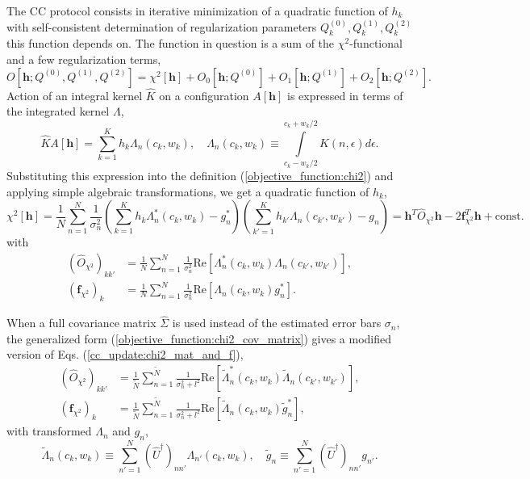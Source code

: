 \documentclass[]{article}
\begin{document}
The CC protocol consists in iterative minimization of a quadratic function of $h_k$ with self-consistent determination of regularization parameters $Q^{(0)}_k, Q^{(1)}_k, Q^{(2)}_k$ this function depends on. The function in question is a sum of the $\chi^2$-functional and a few regularization terms,
\begin{equation}
    O[\mathbf{h}; Q^{(0)},Q^{(1)},Q^{(2)}] = \chi^2[\mathbf{h}]
     + O_0[\mathbf{h};Q^{(0)}]
     + O_1[\mathbf{h};Q^{(1)}]
     + O_2[\mathbf{h};Q^{(2)}].
\end{equation}
 Action of an integral kernel $\hat K$ on a configuration $A[\mathbf{h}]$ is expressed in terms of the integrated kernel $\Lambda$,
\begin{equation}
    \hat K A[\mathbf{h}] = \sum_{k=1}^K h_k \Lambda_n(c_k, w_k), \quad
    \Lambda_n(c_k, w_k) \equiv
    \int\limits_{c_k-w_k/2}^{c_k+w_k/2} K(n,\epsilon) d\epsilon.
\end{equation}
Substituting this expression into the definition (\ref{objective_function:chi2}) and applying simple algebraic transformations, we get a quadratic function of $h_k$,
\begin{equation}
    \chi^2[\mathbf{h}] =
    \frac{1}{N} \sum_{n=1}^N \frac{1}{\sigma_n^2}
    \left(\sum_{k=1}^K h_k \Lambda_n^*(c_k, w_k) - g^*_n\right)
    \left(\sum_{k'=1}^K h_{k'} \Lambda_n(c_{k'}, w_{k'}) - g_n\right) =
    \mathbf{h}^T \hat O_{\chi^2} \mathbf{h}
    -2\mathbf{f}^T_{\chi^2} \mathbf{h} + \mathrm{const}.
\end{equation}
with
\begin{align}\label{cc_update:chi2_mat_and_f}
    (\hat O_{\chi^2})_{kk'} &= \frac{1}{N} \sum_{n=1}^N \frac{1}{\sigma_n^2}
        \mathrm{Re}\left[
        \Lambda^*_n(c_k, w_k) \Lambda_n(c_{k'}, w_{k'})
        \right],\nonumber\\
    (\mathbf{f}_{\chi^2})_k &= \frac{1}{N} \sum_{n=1}^N \frac{1}{\sigma_n^2}
        \mathrm{Re}\left[\Lambda_n(c_k, w_k) g_n^*\right].
\end{align}

When a full covariance matrix $\hat{\Sigma}$ is used instead of the estimated error bars $\sigma_n$, the generalized form (\ref{objective_function:chi2_cov_matrix}) gives a modified version of Eqs. (\ref{cc_update:chi2_mat_and_f}),
\begin{align}
    (\hat O_{\chi^2})_{kk'} &= \frac{1}{\tilde N} \sum_{n=1}^{\tilde N} \frac{1}{\sigma_n^2 + l^2}
    \mathrm{Re}\left[
    \tilde\Lambda^*_n(c_k, w_k) \tilde\Lambda_n(c_{k'}, w_{k'})
    \right],\nonumber\\
    (\mathbf{f}_{\chi^2})_k &= \frac{1}{\tilde N} \sum_{n=1}^{\tilde N} \frac{1}{\sigma_n^2 + l^2}
    \mathrm{Re}\left[\tilde\Lambda_n(c_k, w_k) \tilde g_n^*\right],
\end{align}
with transformed $\Lambda_n$ and $g_n$,
\begin{equation}
    \tilde\Lambda_n(c_k, w_k) \equiv
    \sum_{n'=1}^N (\hat U^\dagger)_{nn'} \Lambda_{n'}(c_k, w_k),\quad
    \tilde g_n \equiv
    \sum_{n'=1}^N (\hat U^\dagger)_{nn'} g_{n'}.
\end{equation}
\end{document}
